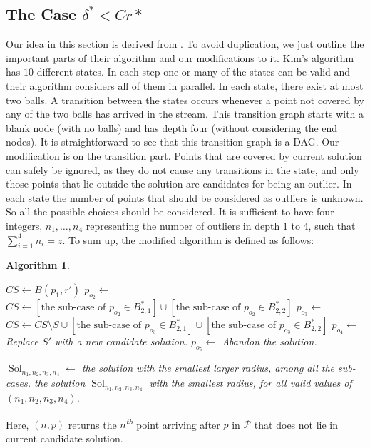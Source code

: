 \documentclass[envcountsame]{cls/cccg15}
\newtheorem{algorithm}{Algorithm}
\newcommand{\nth}{\textsuperscript{\textit{th}} }
\newcommand{\set}[1]{\left\{ #1 \right\}}
\newcommand{\provided}{\,:\,}
\begin{document}
\subsection{The Case $\delta^* < C r*$}
\label{subsec:smaller}
Our idea in this section is derived from \cite{ahn2014computing, kim2014improved}. To avoid duplication, we just outline the important parts of their algorithm and our modifications to it. Kim's algorithm has $10$ different states. In each step one or many of the states can be valid and their algorithm considers all of them in parallel. In each state, there exist at most two balls. A transition between the states occurs whenever a point not covered by any of the two balls has arrived in the stream. This transition graph starts with a blank node (with no balls) and has depth four (without considering the end nodes). It is straightforward to see that this transition graph is a DAG.
Our modification is on the transition part.
Points that are covered by current solution can safely be ignored, as they do not cause any transitions in the state, and only those points that lie outside the solution are candidates for being an outlier.
In each state the number of points that should be considered as outliers is unknown. So all the possible choices should be considered. It is sufficient to have four integers, $n_1,\dots, n_4$ representing the number of outliers in depth $1$ to $4$, such that $\sum_{i=1}^{4} n_i=z$. To sum up, the modified algorithm is defined as follows:
{
\algrenewcommand\algorithmicindent{0.8em}%
\begin{algorithm}
\label{alg:smallc}
\leavevmode
\begin{algorithmic}
	\For{$(n_1, \dots, n_4) \gets \set{(n_1, \dots, n_4) \provided \sum n_i=z}$}
		\State $CS \gets B(p_1,r')$
		\State $p_{o_2} \gets $ 
			\State $CS\gets [ \text{the sub-case of $p_{o_2} \in B_{2, 1}^*$} ] \cup [ \text{the sub-case of $p_{o_2} \in B_{2,2}^*$} ]$
				\State $p_{o_3} \gets$ 
					\State $CS\gets CS\setminus S \cup [ \text{the sub-case of $p_{o_3} \in B_{2, 1}^*$} ] \cup [ \text{the sub-case of $p_{o_3} \in B_{2,2}^*$}]$
						\State $p_{o_4} \gets$ 
							\State Replace $S'$ with a new candidate solution.
							\State $p_{o_5} \gets$ 
								\State Abandon the solution.
							\EndIf
						\EndIf
					\EndFor
				\EndIf
			\EndFor

		\EndIf
		\State $\mathop{Sol}_{n_1,n_2,n_3,n_4} \gets$ the solution with the smallest larger radius, among all the sub-cases.
	\EndFor
	\State \Return the solution $\mathop{Sol}_{n_1,n_2,n_3,n_4}$ with the smallest radius, for all valid values of $(n_1,n_2,n_3,n_4)$.
\EndFunction
\end{algorithmic}
\end{algorithm}
}
Here, $(n,p)$ returns the $n$\nth point arriving after $p$ in $\mathcal{P}$ that does not lie in current candidate solution.
\end{document}
